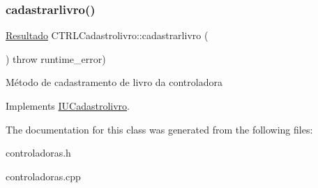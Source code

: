 \subsubsection{\texorpdfstring{cadastrarlivro()}{cadastrarlivro()}}
{\footnotesize\ttfamily \hyperlink{classResultado}{Resultado} C\+T\+R\+L\+Cadastrolivro\+::cadastrarlivro (\begin{DoxyParamCaption}{ }\end{DoxyParamCaption}) throw  runtime\+\_\+error) \hspace{0.3cm}{\ttfamily [virtual]}}

Método de cadastramento de livro da controladora 

Implements \hyperlink{classIUCadastrolivro}{I\+U\+Cadastrolivro}.



The documentation for this class was generated from the following files\+:\begin{DoxyCompactItemize}
\item 
controladoras.\+h\item 
controladoras.\+cpp\end{DoxyCompactItemize}
